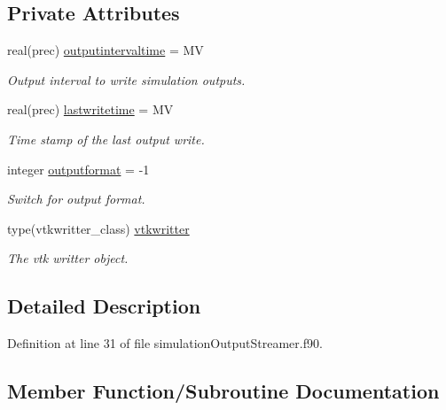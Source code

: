 \subsection*{Private Attributes}
\begin{DoxyCompactItemize}
\item 
real(prec) \mbox{\hyperlink{structsimulationoutputstreamer__mod_1_1output__streamer__class_aacf7688bfe4a91af5a8db9e7003a041b}{outputintervaltime}} = MV
\begin{DoxyCompactList}\small\item\em Output interval to write simulation outputs. \end{DoxyCompactList}\item 
real(prec) \mbox{\hyperlink{structsimulationoutputstreamer__mod_1_1output__streamer__class_a9ea996af0c9a2d9f3930092e83ca71bb}{lastwritetime}} = MV
\begin{DoxyCompactList}\small\item\em Time stamp of the last output write. \end{DoxyCompactList}\item 
integer \mbox{\hyperlink{structsimulationoutputstreamer__mod_1_1output__streamer__class_a53a4af6464bb24e7191a7632fb3b4f38}{outputformat}} = -\/1
\begin{DoxyCompactList}\small\item\em Switch for output format. \end{DoxyCompactList}\item 
type(vtkwritter\+\_\+class) \mbox{\hyperlink{structsimulationoutputstreamer__mod_1_1output__streamer__class_a883916a5ede4ceff754115bd3317649e}{vtkwritter}}
\begin{DoxyCompactList}\small\item\em The vtk writter object. \end{DoxyCompactList}\end{DoxyCompactItemize}


\subsection{Detailed Description}


Definition at line 31 of file simulation\+Output\+Streamer.\+f90.



\subsection{Member Function/\+Subroutine Documentation}
\mbox{\label{structsimulationoutputstreamer__mod_1_1output__streamer__class_a2085a877c0b95c662c0012d911e34c58}} 
